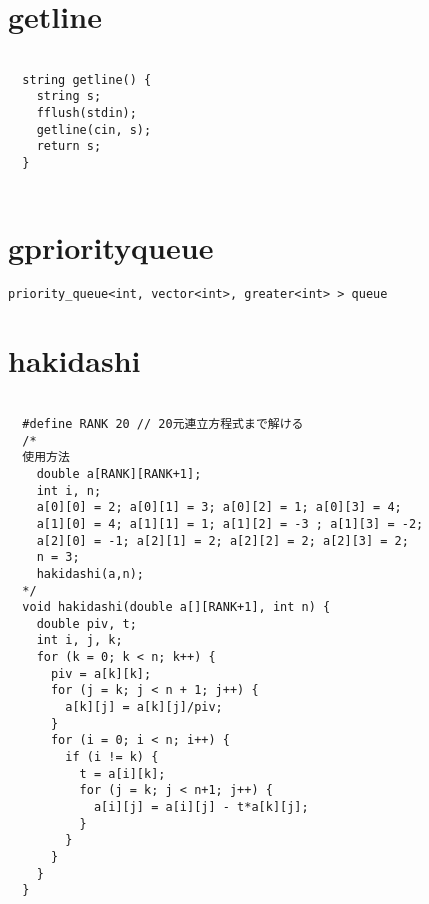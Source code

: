 \documentclass{jsarticle}
\begin{document}
\color{white}
\section{getline}
\color{black}
\begin{lstlisting}[caption=getline]

  string getline() {
    string s;
    fflush(stdin);
    getline(cin, s);
    return s;
  }
  

\end{lstlisting}

\color{white}
\section{gpriorityqueue}
\color{black}
\begin{lstlisting}[caption=gpriorityqueue]
priority_queue<int, vector<int>, greater<int> > queue

\end{lstlisting}

\color{white}
\section{hakidashi}
\color{black}
\begin{lstlisting}[caption=hakidashi]

  #define RANK 20 // 20元連立方程式まで解ける
  /*
  使用方法
    double a[RANK][RANK+1];
    int i, n;
    a[0][0] = 2; a[0][1] = 3; a[0][2] = 1; a[0][3] = 4;
    a[1][0] = 4; a[1][1] = 1; a[1][2] = -3 ; a[1][3] = -2;
    a[2][0] = -1; a[2][1] = 2; a[2][2] = 2; a[2][3] = 2;
    n = 3;
    hakidashi(a,n);
  */
  void hakidashi(double a[][RANK+1], int n) { 
    double piv, t;
    int i, j, k;
    for (k = 0; k < n; k++) {
      piv = a[k][k];
      for (j = k; j < n + 1; j++) {
        a[k][j] = a[k][j]/piv;
      }
      for (i = 0; i < n; i++) {
        if (i != k) {
          t = a[i][k];
          for (j = k; j < n+1; j++) {
            a[i][j] = a[i][j] - t*a[k][j];
          }
        }
      }
    }
  }
  

\end{lstlisting}

\color{white}
\end{document}
